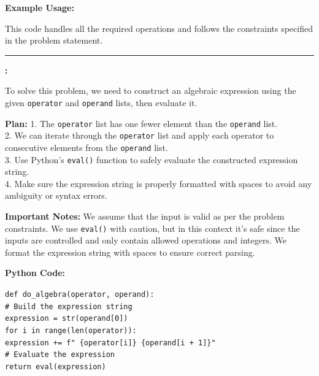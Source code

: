 \begin{ReasoningBox}[title={Case Study: Code Generation (Smaller \& Larger Setting)}, breakable]
\textbf{Example Usage:}\\
\hspace*{1em}

This code handles all the required operations and follows the constraints specified in the problem statement.


\medskip
\noindent\rule{\linewidth}{0.4pt}
\medskip

\textbf{\ours:}

To solve this problem, we need to construct an algebraic expression using the given \texttt{operator} and \texttt{operand} lists, then evaluate it.

\textbf{Plan:}
1. The \texttt{operator} list has one fewer element than the \texttt{operand} list.\\
2. We can iterate through the \texttt{operator} list and apply each operator to consecutive elements from the \texttt{operand} list.\\
3. Use Python's \texttt{eval()} function to safely evaluate the constructed expression string.\\
4. Make sure the expression string is properly formatted with spaces to avoid any ambiguity or syntax errors.

\textbf{Important Notes:} We assume that the input is valid as per the problem constraints. We use \texttt{eval()} with caution, but in this context it's safe since the inputs are controlled and only contain allowed operations and integers. We format the expression string with spaces to ensure correct parsing.

\textbf{Python Code:}

\hspace*{1em}\texttt{def do\_algebra(operator, operand):}\\
\hspace*{2.5em}\texttt{\# Build the expression string}\\
\hspace*{2.5em}\texttt{expression = str(operand[0])}\\
\hspace*{2.5em}\texttt{for i in range(len(operator)):}\\
\hspace*{4em}\texttt{expression += f"\ \{operator[i]\}\ \{operand[i + 1]\}"}\\
\hspace*{2.5em}\texttt{\# Evaluate the expression}\\
\hspace*{2.5em}\texttt{return eval(expression)}


\end{ReasoningBox}
